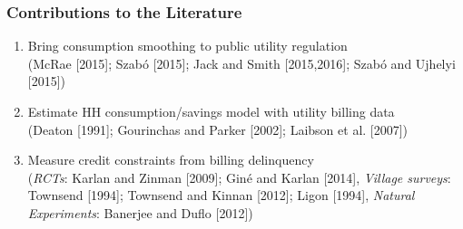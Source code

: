 \documentclass[aspectratio=149]{beamer}
\begin{document}
\begin{frame}
\frametitle{Contributions to the Literature}

\begin{enumerate}
\item Bring consumption smoothing to public utility regulation \\
{\footnotesize (McRae [2015]; Szab\'o [2015]; Jack and Smith [2015,2016]; Szab\'o and Ujhelyi [2015])}
\vspace{2mm}

\item Estimate HH consumption/savings model with utility billing data \\
{\footnotesize (Deaton [1991]; Gourinchas and Parker [2002]; Laibson et al. [2007])}
\vspace{2mm}

\item Measure credit constraints from billing delinquency \\
{ \footnotesize (\textit{RCTs}: Karlan and Zinman [2009]; Gin\'e and Karlan [2014],  \textit{Village surveys}: Townsend [1994]; Townsend and Kinnan [2012]; Ligon [1994], \textit{Natural Experiments}: Banerjee and Duflo [2012]) }

\end{enumerate}

\end{frame}








\end{document}
